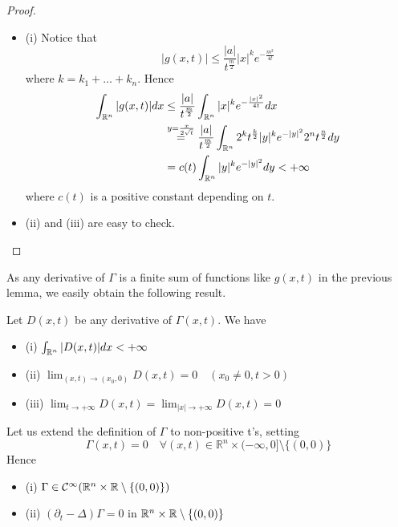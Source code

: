 \begin{ProofBox}
    \begin{proof}
    \begin{itemize}
        \item (i) Notice that 
        \begin{equation*}
            |g(x,t)| \leq \frac{|a|}{t^\frac{m}{2}} |x|^k e^{-\frac{m^2}{4t}}
        \end{equation*}
        where $k = k_1 +\ldots + k_n$. Hence 
        \begin{align*}
            \int_{\mathbb{R}^n}|g(x,t)|dx &\leq \frac{|a|}{t^\frac{m}{2}}\int_{\mathbb{R}^n} |x|^k e^{-\frac{|x|^2}{4t}}dx \\
        &\stackrel{y=\frac{x}{2\sqrt{t}}}= \frac{|a|}{t^\frac{m}{2}} \int_{\mathbb{R}^n} 2^k t^\frac{k}{2} |y|^k e^{-|y|^2} 2^n t^\frac{n}{2} dy \\
        &= c(t) \int_{\mathbb{R}^n} |y|^k e^{-|y|^2} dy < +\infty
        \end{align*}
        where $c(t)$ is a positive constant depending on $t$.
        \item (ii) and (iii) are easy to check. 
    \end{itemize}
\end{proof}
\end{ProofBox}
As any derivative of $\Gamma$ is a finite sum of functions like $g(x,t)$ in the previous lemma, we easily obtain the following result. 

\begin{PropBox}
    \begin{Proposition}
        Let $D(x,t)$ be any derivative of $\Gamma(x,t)$. We have
        \begin{itemize}
            \item (i) $\int_{\mathbb{R}^n} |D(x,t)| dx < +\infty$
            \item (ii) $\lim_{(x,t) \rightarrow (x_0,0)}D(x,t) = 0 \quad (x_0 \neq 0, t> 0)$
            \item (iii) $\lim_{t \rightarrow +\infty} D(x,t) = \lim_{|x| \rightarrow +\infty} D(x,t) = 0$ 
        \end{itemize}
    \end{Proposition}
\end{PropBox}

\begin{Cor}
    Let us extend the definition of $\Gamma$ to non-positive t's, setting 
    \begin{equation*}
        \Gamma(x,t)= 0 \quad \forall (x,t) \in \mathbb{R}^n \times (-\infty,0] \setminus \{(0,0)\}
    \end{equation*}
    Hence 
    \begin{itemize}
        \item (i) $\Gamma \in \mathcal{C}^\infty (\mathbb{R}^n \times \mathbb{R} \setminus \{(0,0)\})$
        \item (ii) $(\partial_t - \Delta) \Gamma = 0$ in $\mathbb{R}^n \times \mathbb{R} \setminus \{(0,0)\}$
    \end{itemize}
\end{Cor}

